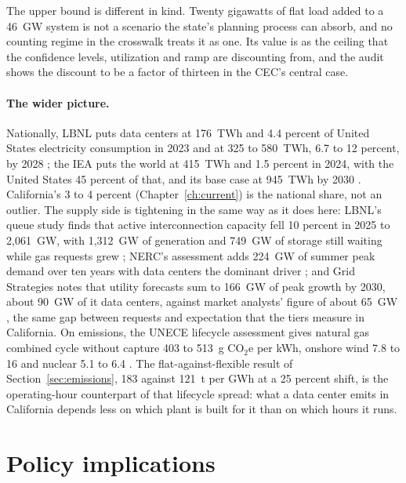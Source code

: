 The upper bound is different in kind. Twenty gigawatts of flat load added to a 46~GW system is not a scenario the state's planning process can absorb, and no counting regime in the crosswalk treats it as one. Its value is as the ceiling that the confidence levels, utilization and ramp are discounting from, and the audit shows the discount to be a factor of thirteen in the CEC's central case.

\paragraph{The wider picture.} Nationally, LBNL puts data centers at 176~TWh and 4.4 percent of United States electricity consumption in 2023 and at 325 to 580~TWh, 6.7 to 12 percent, by 2028 \citep{lbnl2024}; the IEA puts the world at 415~TWh and 1.5 percent in 2024, with the United States 45 percent of that, and its base case at 945~TWh by 2030 \citep{iea2025}. California's 3 to 4 percent (Chapter~\ref{ch:current}) is the national share, not an outlier. The supply side is tightening in the same way as it does here: LBNL's queue study finds that active interconnection capacity fell 10 percent in 2025 to 2,061~GW, with 1,312~GW of generation and 749~GW of storage still waiting while gas requests grew \citep{lbnl_queued2026}; NERC's assessment adds 224~GW of summer peak demand over ten years with data centers the dominant driver \citep{nerc_ltra2025}; and Grid Strategies notes that utility forecasts sum to 166~GW of peak growth by 2030, about 90~GW of it data centers, against market analysts' figure of about 65~GW \citep{gridstrategies2025}, the same gap between requests and expectation that the tiers measure in California. On emissions, the UNECE lifecycle assessment gives natural gas combined cycle without capture 403 to 513~g CO$_2$e per kWh, onshore wind 7.8 to 16 and nuclear 5.1 to 6.4 \citep{unece2022}. The flat-against-flexible result of Section~\ref{sec:emissions}, 183 against 121~t per GWh at a 25 percent shift, is the operating-hour counterpart of that lifecycle spread: what a data center emits in California depends less on which plant is built for it than on which hours it runs.

\section{Policy implications}
\label{sec:policy}

